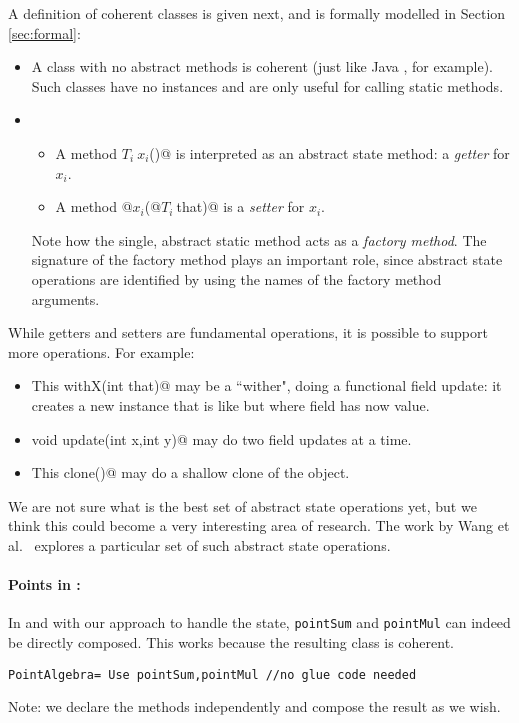 A definition of coherent
classes is given next, and is formally modelled in Section \ref{sec:formal}:
\begin{itemize}
\item A class with no abstract methods is coherent (just like Java
  \Q@Math@, for example). Such classes have no instances and are only useful for calling static methods.
\item {}
\begin{itemize}
\item A method $T_i\ x_i$\Q@()@ is interpreted as an abstract state method: a \emph{getter} for $x_i$.
\item A method \Q@void @$x_i$\Q@(@$T_i\ $\Q@ that)@ is a \emph{setter} for $x_i$.
\end{itemize}

Note how the single, abstract static
method acts as a \emph{factory method}.
The signature of the factory method plays an important role, since
abstract state operations are identified by using the names of the
factory method arguments.
\end{itemize}
\noindent
While getters and setters are fundamental operations, it is possible to
support more operations. For example:
\begin{itemize}
\item \Q@method This withX(int that)@
may be a ``wither", doing a functional field update: it creates a new instance that is like \Q@this@ but where field \Q@x@ has now \Q@that@ value.
\item \Q@method void update(int x,int y)@
may do two field updates at a time.
\item\Q@method This clone()@ may do a shallow clone of the object.
\end{itemize}

We are not sure what is the best set of abstract state operations yet,
but we think this could become a very interesting area of research.
The work by Wang et al.~\cite{wang2016classless} explores a particular
set of such abstract state operations.

\paragraph{Points in \name:}
In \name and with our approach to handle the state, 
\lstinline{pointSum} and \lstinline{pointMul} can indeed be directly composed.
This works because the resulting class is coherent.
\saveSpace\saveSpace
\begin{lstlisting}
PointAlgebra= Use pointSum,pointMul //no glue code needed
\end{lstlisting}  
\saveSpace\saveSpace
\noindent
  Note: we declare the methods independently and compose the result
  as we wish. 

